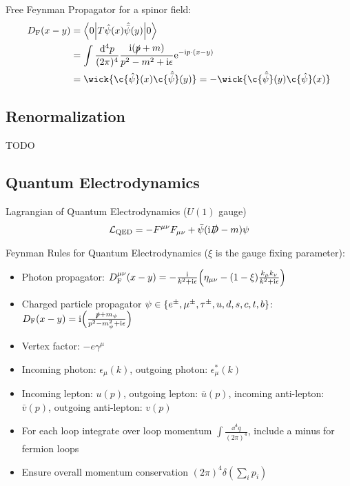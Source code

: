 			\noindent
			Free Feynman Propagator for a spinor field:
			\begin{equation}
				\begin{aligned}
					D_\text{F}(x-y) &= \mel**{0}{T\hat{\psi}(x)\hat{\bar\psi}(y)}{0} \\
					&= \int \frac{\dd^4 p}{(2\pi)^4} \frac{\i(\slashed{p}+m)}{p^2-m^2+\i\epsilon} \ex^{-\i p\cdot(x-y)} \\
					&= \wick{\c{\hat{\psi}}(x) \c{\hat{\bar{\psi}}}(y)} = - \wick{\c{\hat{\bar{\psi}}}(y) \c{\hat\psi}(x)}
				\end{aligned}
			\end{equation}
			
	\subsection{Renormalization}
		TODO

	\subsection{Quantum Electrodynamics}
		Lagrangian of Quantum Electrodynamics ($U(1)$ gauge)
		\begin{equation}
			\mathcal{L}_\mathrm{QED} = -F^{\mu\nu}F_{\mu\nu} + \bar{\psi}(\mathrm{i}\slashed{D}-m)\psi		
		\end{equation}

		\noindent
		Feynman Rules for Quantum Electrodynamics ($\xi$ is the gauge fixing parameter):
		\begin{itemize}\itemsep -0pt
			\item Photon propagator: $D_\text{F}^{\mu\nu}(x-y) = -\frac{\mathrm{i}}{k^2+\mathrm{i}\epsilon} \qty(\eta_{\mu\nu}-(1-\xi)\frac{k_\mu k_\nu}{k^2+\mathrm{i}\epsilon} )$
			\item Charged particle propagator $\psi \in \qty{e^\pm, \mu^\pm ,\tau^\pm, u,d,s,c,t,b}$: $D_\text{F}(x-y) = \mathrm{i}\qty(\frac{\slashed{p}+m_\psi}{p^2-m_\psi^2+\mathrm{i}\epsilon})$
			\item Vertex factor: $-e\gamma^\mu$
			\item Incoming photon: $\epsilon_\mu(k)$, outgoing photon: $\epsilon^{*}_\mu(k)$
			\item Incoming lepton: $u(p)$, outgoing lepton: $\bar{u}(p)$, incoming anti-lepton: $\bar{v}(p)$, outgoing anti-lepton: $v(p)$
			\item For each loop integrate over loop momentum $\int \frac{\dd^4 q}{(2\pi)^4}$, include a minus for fermion loops
			\item Ensure overall momentum conservation $(2\pi)^4 \delta(\sum_i p_i)$
		\end{itemize}

